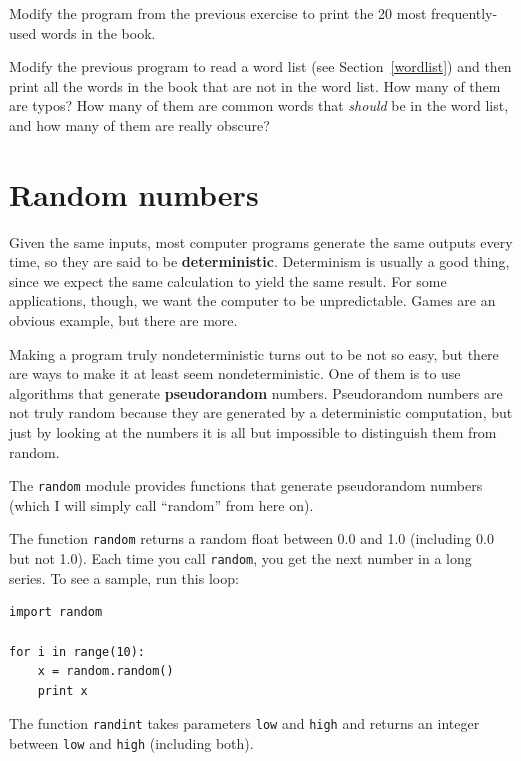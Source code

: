\begin{ex}
Modify the program from the previous exercise to print the
20 most frequently-used words in the book.
\end{ex}


\begin{ex}
Modify the previous program to read a word list (see
Section~\ref{wordlist}) and then print all the words in the book that
are not in the word list.  How many of them are typos?  How many of
them are common words that {\em should} be in the word list, and how
many of them are really obscure?
\end{ex}


\section{Random numbers}


Given the same inputs, most computer programs generate the same
outputs every time, so they are said to be {\bf deterministic}.
Determinism is usually a good thing, since we expect the same
calculation to yield the same result.  For some applications, though,
we want the computer to be unpredictable.  Games are an obvious
example, but there are more.

Making a program truly nondeterministic turns out to be not so easy,
but there are ways to make it at least seem nondeterministic.  One of
them is to use algorithms that generate {\bf pseudorandom} numbers.
Pseudorandom numbers are not truly random because they are generated
by a deterministic computation, but just by looking at the numbers it
is all but impossible to distinguish them from random.


The {\tt random} module provides functions that generate
pseudorandom numbers (which I will simply call ``random'' from
here on).


The function {\tt random} returns a random float
between 0.0 and 1.0 (including 0.0 but not 1.0).  Each time you
call {\tt random}, you get the next number in a long series.  To see a
sample, run this loop:

\beforeverb
\begin{verbatim}
import random

for i in range(10):
    x = random.random()
    print x
\end{verbatim}
\afterverb
%
The function {\tt randint} takes parameters {\tt low} and
{\tt high} and returns an integer between {\tt low} and
{\tt high} (including both).

